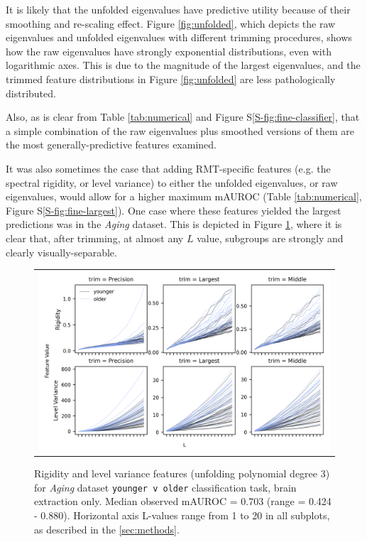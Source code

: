 \documentclass[12pt]{spieman}  %
\begin{document}
\begin{spacing}{2}
It is likely that the unfolded eigenvalues have predictive utility because of
their smoothing and re-scaling effect. Figure \ref{fig:unfolded}, which depicts
the raw eigenvalues and unfolded eigenvalues with different trimming
procedures, shows how the raw eigenvalues have strongly exponential
distributions, even with logarithmic axes. This is due to the
magnitude of the largest eigenvalues, and the trimmed feature distributions in
Figure \ref{fig:unfolded} are less pathologically distributed.

Also, as is clear from Table \ref{tab:numerical} and Figure S\ref{S-fig:fine-classifier}, that
a simple combination of the raw eigenvalues plus smoothed versions of them are the most
generally-predictive features examined.

It was also sometimes the case that adding RMT-specific features (e.g. the spectral
rigidity, or level variance) to either the unfolded eigenvalues, or raw
eigenvalues, would allow for a higher maximum mAUROC (Table
\ref{tab:numerical}, Figure S\ref{S-fig:fine-largest}). One case where these
features yielded the largest predictions was in the \textit{Aging} dataset.
This is depicted in Figure \ref{fig:observables}, where it is clear that, after
trimming, at almost any \(L\) value, subgroups are strongly and clearly
visually-separable.

\begin{figure}
\begin{center}
\begin{tabular}{c}
\includegraphics[width=6.5in]{observables_older_younger_v_older.png}
\end{tabular}
\end{center}
\caption
{ \label{fig:observables} Rigidity and level variance features (unfolding
polynomial degree 3) for \textit{Aging} dataset \footnotesize\texttt{younger v
older} classification task, brain extraction only. Median observed mAUROC =
0.703 (range = 0.424 - 0.880). Horizontal axis L-values range from 1 to 20 in
all subplots, as described in the \ref{sec:methods}.}
\end{figure}


\end{spacing}
\end{document}
